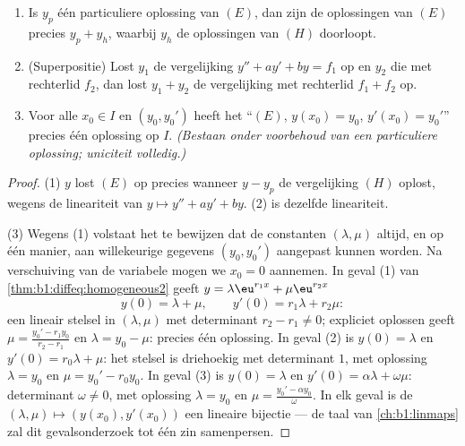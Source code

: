 \begin{theorem}\label{thm:b1:diffeq:structure2}
\begin{enumerate}
  \item Is $y_p$ één particuliere oplossing van $(E)$, dan zijn de
        oplossingen van $(E)$ precies $y_p + y_h$, waarbij $y_h$ de
        oplossingen van $(H)$ doorloopt.
  \item (Superpositie) Lost $y_1$ de vergelijking $y'' + ay' + by =
        f_1$ op en $y_2$ die met rechterlid $f_2$, dan lost $y_1 + y_2$
        de vergelijking met rechterlid $f_1 + f_2$ op.
  \item Voor alle $x_0 \in I$ en $(y_0, y_0')$ heeft het
         ``$(E)$, $y(x_0) = y_0$, $y'(x_0) = y_0'$''
        precies één oplossing op $I$. \emph{(Bestaan onder voorbehoud
        van een particuliere oplossing; uniciteit volledig.)}
\end{enumerate}
\end{theorem}

\begin{proof}
(1) $y$ lost $(E)$ op precies wanneer $y - y_p$ de vergelijking $(H)$
oplost, wegens de lineariteit van $y \mapsto y'' + ay' + by$. (2) is
dezelfde lineariteit.

(3) Wegens (1) volstaat het te bewijzen dat de constanten $(\lambda,
\mu)$ altijd, en op één manier, aan willekeurige gegevens $(y_0, y_0')$
aangepast kunnen worden. Na verschuiving van de variabele mogen we $x_0 =
0$ aannemen. In geval (1) van
\cref{thm:b1:diffeq:homogeneous2} geeft $y = \lambda\eu^{r_1x} +
\mu\eu^{r_2x}$
\[
y(0) = \lambda + \mu, \qquad y'(0) = r_1\lambda + r_2\mu :
\]
een lineair stelsel in $(\lambda, \mu)$ met determinant $r_2 - r_1 \neq
0$; expliciet oplossen geeft $\mu = \frac{y_0' - r_1y_0}{r_2 - r_1}$ en
$\lambda = y_0 - \mu$: precies één oplossing. In geval (2) is $y(0) =
\lambda$ en $y'(0) = r_0\lambda + \mu$: het stelsel is driehoekig met
determinant $1$, met oplossing $\lambda = y_0$ en $\mu = y_0' - r_0y_0$.
In geval (3) is $y(0) = \lambda$ en $y'(0) = \alpha\lambda + \omega\mu$:
determinant $\omega \neq 0$, met oplossing $\lambda = y_0$ en $\mu =
\frac{y_0' - \alpha y_0}\omega$. In elk geval is de  $(\lambda,
\mu) \mapsto (y(x_0), y'(x_0))$ een lineaire bijectie --- de taal van
\cref{ch:b1:linmaps} zal dit gevalsonderzoek tot één zin samenpersen.
\end{proof}

